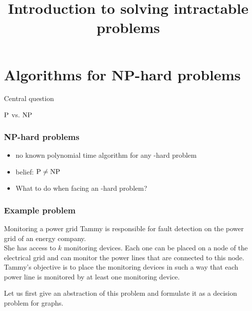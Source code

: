 
\newcommand{\mycomp}[1]{\pgfmathparse{#1}\pgfmathprintnumber[precision=0]{\pgfmathresult}}



\title[Introduction]
{Introduction to solving intractable problems}

\begin{frame}
	\titlepage{}
\end{frame}

\lecturenotes{\maketitle}

\begin{frame}
	\tableofcontents
\end{frame}

\section{Algorithms for NP-hard problems}

\begin{frame}

	Central question
	\begin{center}
		{\huge $\P$ vs. $\NP$}
	\end{center}
\end{frame}

\begin{frame}
	\frametitle{NP-hard problems}

	\begin{itemize}
		\item no known polynomial time algorithm for any \NP-hard problem
		\item belief: $\P \neq \NP$
		\item What to do when facing an \NP-hard problem?
	\end{itemize}
\end{frame}


\begin{frame}
	\frametitle{Example problem}

	\begin{block}{Monitoring a power grid}
		Tammy is responsible for fault detection on the power grid of an energy company.\\\smallskip
		She has access to $k$ monitoring devices. Each one can be placed on a node of the electrical grid and can monitor the power lines that are connected to this node.\\\smallskip
		Tammy's objective is to place the monitoring devices in such a way that each power line is monitored by at least one monitoring device.
	\end{block}
	Let us first give an abstraction of this problem and formulate it as a decision problem for graphs.
\end{frame}


